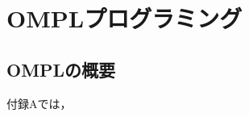 \chapter{OMPLプログラミング}
\setcounter{page}{1}
\renewcommand{\thepage}{A--\arabic{page}}

\thispagestyle{empty}
\newpage



\section{OMPLの概要}
付録Aでは，

\clearpage


